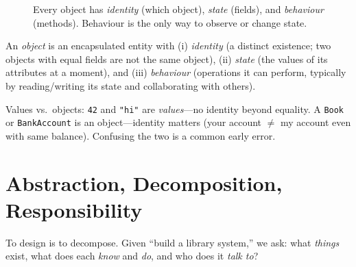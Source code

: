 \begin{figure}[h]
\centering
{}
\caption{Every object has \emph{identity} (which object), \emph{state} (fields), and \emph{behaviour} (methods). Behaviour is the only way to observe or change state.}
\label{fig:object-anatomy}
\end{figure}

\begin{definition}
An \emph{object} is an encapsulated entity with (i) \emph{identity} (a distinct existence; two objects with equal fields are not the same object), (ii) \emph{state} (the values of its attributes at a moment), and (iii) \emph{behaviour} (operations it can perform, typically by reading/writing its state and collaborating with others).
\end{definition}

Values vs.\ objects: \texttt{42} and \texttt{"hi"} are \emph{values}---no identity beyond equality. A \texttt{Book} or \texttt{BankAccount} is an object---identity matters (your account $\neq$ my account even with same balance). Confusing the two is a common early error.

\section{Abstraction, Decomposition, Responsibility}
\label{sec:abstraction}
To design is to decompose. Given ``build a library system,'' we ask: what \emph{things} exist, what does each \emph{know} and \emph{do}, and who does it \emph{talk to}?

